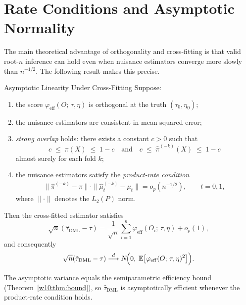 \documentclass[master.tex]{subfiles}
\begin{document}
\section{Rate Conditions and Asymptotic Normality}
\label{w11:sec:rates}

The main theoretical advantage of orthogonality and cross-fitting is
that valid root-$n$ inference can hold even when nuisance estimators
converge more slowly than $n^{-1/2}$.  The following result makes
this precise.

\begin{thm}{Asymptotic Linearity Under Cross-Fitting}
\label{w11:thm:asymp}
Suppose:
\begin{enumerate}[label=(\roman*)]
  \item the score $\varphi_{\mathrm{eff}}(O;\,\tau,\eta)$ is
    orthogonal at the truth $(\tau_0, \eta_0)$;
  \item the nuisance estimators are consistent in mean squared error;
  \item \emph{strong overlap} holds: there exists a constant $c > 0$
    such that
    \[
      c \;\leq\; \pi(X) \;\leq\; 1 - c
      \quad\text{and}\quad
      c \;\leq\; \hat\pi^{(-k)}(X) \;\leq\; 1 - c
    \]
    almost surely for each fold $k$;
  \item the nuisance estimators satisfy the
    \emph{product-rate condition}
    \begin{align}
      \|\hat\pi^{(-k)} - \pi\| \cdot
      \|\hat\mu_t^{(-k)} - \mu_t\|
      = o_p(n^{-1/2}),
      \qquad t = 0, 1,
      \label{w11:eq:product-rate}
    \end{align}
    where $\|\cdot\|$ denotes the $L_2(P)$ norm.
\end{enumerate}
Then the cross-fitted estimator satisfies
\[
  \sqrt{n}(\hat\tau_{\mathrm{DML}} - \tau)
  =
  \frac{1}{\sqrt{n}}\sum_{i=1}^n
  \varphi_{\mathrm{eff}}(O_i;\,\tau,\eta)
  + o_p(1),
\]
and consequently
\[
  \sqrt{n}(\hat\tau_{\mathrm{DML}} - \tau)
  \overset{d}{\longrightarrow}
  N\!\Bigl(0,\;\mathbb{E}\bigl[\varphi_{\mathrm{eff}}(O;\,\tau,\eta)^2\bigr]\Bigr).
\]
\end{thm}

The asymptotic variance equals the semiparametric efficiency bound
(Theorem~\ref{w10:thm:bound}), so $\hat\tau_{\mathrm{DML}}$ is
asymptotically efficient whenever the product-rate condition holds.
\end{document}
